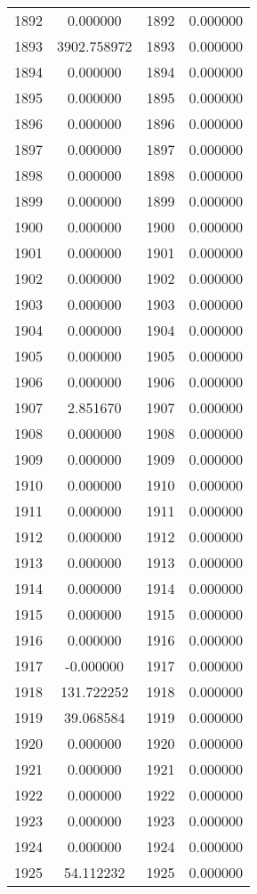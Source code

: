 \documentclass[12pt]{article}
\begin{document}
\begin{longtable}{@{}cccc@{}}
1892 & 0.000000 & 1892 & 0.000000 \\
1893 & 3902.758972 & 1893 & 0.000000 \\
1894 & 0.000000 & 1894 & 0.000000 \\
1895 & 0.000000 & 1895 & 0.000000 \\
1896 & 0.000000 & 1896 & 0.000000 \\
1897 & 0.000000 & 1897 & 0.000000 \\
1898 & 0.000000 & 1898 & 0.000000 \\
1899 & 0.000000 & 1899 & 0.000000 \\
1900 & 0.000000 & 1900 & 0.000000 \\
1901 & 0.000000 & 1901 & 0.000000 \\
1902 & 0.000000 & 1902 & 0.000000 \\
1903 & 0.000000 & 1903 & 0.000000 \\
1904 & 0.000000 & 1904 & 0.000000 \\
1905 & 0.000000 & 1905 & 0.000000 \\
1906 & 0.000000 & 1906 & 0.000000 \\
1907 & 2.851670 & 1907 & 0.000000 \\
1908 & 0.000000 & 1908 & 0.000000 \\
1909 & 0.000000 & 1909 & 0.000000 \\
1910 & 0.000000 & 1910 & 0.000000 \\
1911 & 0.000000 & 1911 & 0.000000 \\
1912 & 0.000000 & 1912 & 0.000000 \\
1913 & 0.000000 & 1913 & 0.000000 \\
1914 & 0.000000 & 1914 & 0.000000 \\
1915 & 0.000000 & 1915 & 0.000000 \\
1916 & 0.000000 & 1916 & 0.000000 \\
1917 & -0.000000 & 1917 & 0.000000 \\
1918 & 131.722252 & 1918 & 0.000000 \\
1919 & 39.068584 & 1919 & 0.000000 \\
1920 & 0.000000 & 1920 & 0.000000 \\
1921 & 0.000000 & 1921 & 0.000000 \\
1922 & 0.000000 & 1922 & 0.000000 \\
1923 & 0.000000 & 1923 & 0.000000 \\
1924 & 0.000000 & 1924 & 0.000000 \\
1925 & 54.112232 & 1925 & 0.000000 \\

\end{longtable}
\end{document}
